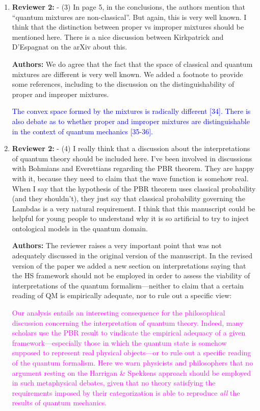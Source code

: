 \documentclass[11pt, executivepaper]{article}
\begin{document}
\begin{enumerate}
\item \textbf{Reviewer 2:} - (3)    In page 5, in the conclusions, the authors mention that “quantum mixtures are non-classical”. But again, this is very well known. I think that the distinction between proper vs improper mixtures should be mentioned here. There is a nice discussion between Kirkpatrick and D’Espagnat on the arXiv about this.
\vspace{2mm}

\textbf{Authors:} We do agree that the fact that the space of classical and quantum mixtures are different is very well known. We added a footnote to provide some references, including to the discussion on the distinguishability of proper and improper mixtures.

\textcolor{blue} {The convex space formed by the mixtures is radically different [34]. There is also debate as to whether proper and improper mixtures are distinguishable in the context of quantum mechanics [35-36].
}

\item \textbf{Reviewer 2:} - (4)    I really think that a discussion about the interpretations of quantum theory should be included here. I’ve been involved in discussions with Bohmians and Everettians regarding the PBR theorem. They are happy with it, because they need to claim that the wave function is somehow real. When I say that the hypothesis of the PBR theorem uses classical probability (and they shouldn’t), they just say that classical probability governing the Lambdas is a very natural requirement. I think that this manuscript could be helpful for young people to understand why it is so artificial to try to inject ontological models in the quantum domain.
\vspace{2mm}

\textbf{Authors:} The reviewer raises a very important point that was not adequately discussed in the original version of the manuscript. In the revised version of the paper we added a new section on interpretations saying that the HS framework should not be employed in order to assess the viability of interpretations of the quantum formalism---neither to claim that a certain reading of QM is empirically adequate, nor to rule out a specific view:

\textcolor{magenta}{Our analysis entails an interesting consequence for the philosophical discussion concerning the interpretation of quantum theory. Indeed, many scholars use the PBR result to vindicate the empirical adequacy of a given framework---especially those in which the quantum state is somehow supposed to represent real physical objects---or to rule out a specific reading of the quantum formalism. Here we warn physicists and philosophers that no argument resting on the Harrigan \& Spekkens approach should be employed in such metaphysical debates, given that no theory satisfying the requirements imposed by their categorization is able to reproduce \emph{all} the results of quantum mechanics.}


\end{enumerate}
\end{document}
